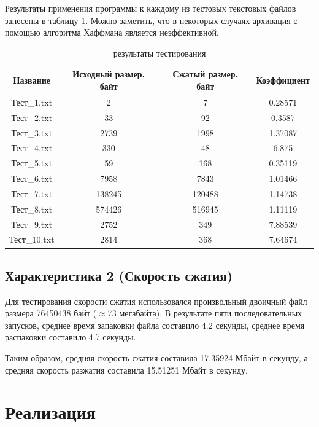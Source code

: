 \documentclass[a4paper,oneside]{article}
\theoremstyle{definition}
\begin{document}
Результаты применения программы к каждому из тестовых текстовых файлов занесены
в таблицу \ref{tbl:results}. Можно заметить, что в некоторых случаях архивация с
помощью алгоритма Хаффмана является неэффективной.

\begin{table}[H]
  \small
  \centering
  \begin{tabular}{|c|c|c|c|}
    \hline
    Название   & Исходный размер, байт & Сжатый размер, байт & Коэффициент \\ \hline \hline
    Тест\_1.txt  & 2           & 7           & 0.28571   \\ \hline
    Тест\_2.txt  & 33          & 92          & 0.3587    \\ \hline
    Тест\_3.txt  & 2739        & 1998        & 1.37087   \\ \hline
    Тест\_4.txt  & 330         & 48          & 6.875     \\ \hline
    Тест\_5.txt  & 59          & 168         & 0.35119   \\ \hline
    Тест\_6.txt  & 7958        & 7843        & 1.01466   \\ \hline
    Тест\_7.txt  & 138245      & 120488      & 1.14738   \\ \hline
    Тест\_8.txt  & 574426      & 516945      & 1.11119   \\ \hline
    Тест\_9.txt  & 2752        & 349         & 7.88539   \\ \hline
    Тест\_10.txt & 2814        & 368         & 7.64674   \\ \hline
  \end{tabular}
  \caption{результаты тестирования}
  \label{tbl:results}
\end{table}

\subsection{Характеристика 2 (Скорость сжатия)}

Для тестирования скорости сжатия использовался произвольный двоичный
файл размера 76450438 байт ($\approx$73 мегабайта). В результате пяти
последовательных запусков, среднее время запаковки файла составило 4.2
секунды, среднее время распаковки составило 4.7 секунды.

Таким образом, средняя скорость сжатия составила 17.35924 Мбайт в секунду, а
средняя скорость разжатия составила 15.51251 Мбайт в секунду.


\section{Реализация}
\end{document}
